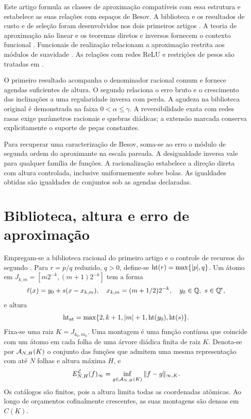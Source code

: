 Este artigo formula as classes de aproximação compatíveis com essa estrutura e estabelece as suas relações com espaços de Besov. A biblioteca e os resultados de custo e de seleção foram desenvolvidos nos dois primeiros artigos \citep{artigo_2-oliveiraI,artigo_2-oliveiraII}. A teoria de aproximação não linear e os teoremas diretos e inversos fornecem o contexto funcional \citep{artigo_1-devore1998,artigo_2-devorepopov1988,artigo_2-petrushev1988,artigo_2-devorelorentz1993}. Funcionais de realização relacionam a aproximação restrita aos módulos de suavidade \citep{artigo_2-hristovivanov1990}. As relações com redes ReLU e restrições de pesos são tratadas em \citet{artigo_1-devore2021,artigo_1-daubechies2022,artigo_2-gribonval2022,artigo_2-grohs2023,artigo_1-guhring2021}.

O primeiro resultado acompanha o denominador racional comum e fornece agendas suficientes de altura. O segundo relaciona o erro bruto e o crescimento das inclinações a uma regularidade inversa com perda. A agudeza na biblioteca original é demonstrada na faixa $0<\alpha\le\gamma$. A reversibilidade exata com redes rasas exige parâmetros racionais e quebras diádicas; a extensão marcada conserva explicitamente o suporte de peças constantes.

Para recuperar uma caracterização de Besov, soma-se ao erro o módulo de segunda ordem do aproximante na escala pareada. A desigualdade inversa vale para qualquer família de funções. A racionalização estabelece a direção direta com altura controlada, inclusive uniformemente sobre bolas. As igualdades obtidas são igualdades de conjuntos sob as agendas declaradas.

\section{Biblioteca, altura e erro de aproximação}
\label{artigo_3:sec:baseIII}
Empregam-se a biblioteca racional do primeiro artigo \citep{artigo_2-oliveiraI} e o controle de recursos do segundo \citep{artigo_2-oliveiraII}. Para $r=p/q$ reduzido, $q>0$, define-se $\operatorname{ht}(r)=\max\{|p|,q\}$. Um átomo em $J_{k,m}=[m2^{-k},(m+1)2^{-k}]$ tem a forma
\begin{equation}
 \ell(x)=y_0+s(x-x_{k,m}),\quad x_{k,m}=(m+1/2)2^{-k},\quad y_0\in\mathbb Q,\ s\in\mathbb{Q}^{\!*},
 \label{artigo_3:eq:inherited-atom}
\end{equation}
e altura
\begin{equation}
 \operatorname{ht}_{\rm at}=\max\{2,k+1,|m|+1,\operatorname{ht}(y_0),\operatorname{ht}(s)\}.
 \label{artigo_3:eq:inherited-height}
\end{equation}
Fixa-se uma raiz $K=J_{k_0,m_0}$. Uma montagem é uma função contínua que coincide com um átomo em cada folha de uma árvore diádica finita de raiz $K$. Denota-se por $\mathcal{A}_{N,H}(K)$ o conjunto das funções que admitem uma mesma representação com até $N$ folhas e altura máxima $H$, e
\[
 E_{N,H}^{\mathcal{L}}(f)_\infty=\inf_{g\in\mathcal{A}_{N,H}(K)}\|f-g\|_{\infty,K}.
\]
Os catálogos são finitos, pois a altura limita todas as coordenadas atômicas. Ao longo de orçamentos cofinalmente crescentes, as suas montagens são densas em $C(K)$.

